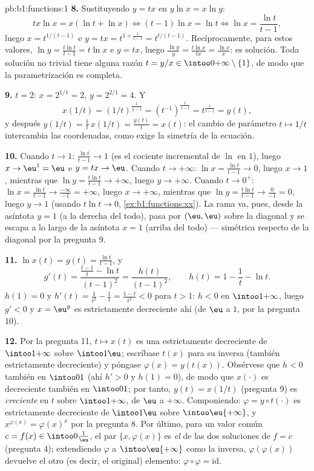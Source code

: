\begin{solution}{pb:b1:functions:1}
\textbf{8.} Sustituyendo $y = tx$ en $y\ln x = x\ln y$:
\[
tx\ln x = x(\ln t + \ln x)
\iff (t - 1)\ln x = \ln t
\iff \ln x = \frac{\ln t}{t - 1} ,
\]
luego $x = t^{1/(t-1)}$ e $y = tx = t^{1 + \frac1{t-1}} = t^{t/(t-1)}$.
Recíprocamente, para estos valores, $\ln y = \frac{t\ln t}{t-1} =
t\ln x$ e $y = tx$, luego $\frac{\ln y}y = \frac{t\ln x}{tx} =
\frac{\ln x}x$: es solución. Toda solución no trivial tiene alguna
razón $t = y/x \in \intoo0{+\infty} \setminus \{1\}$, de modo que la
parametrización es completa.

\textbf{9.} $t = 2$: $x = 2^{1/1} = 2$, $y = 2^{2/1} = 4$. Y
\[
x(1/t) = (1/t)^{\frac1{\frac1t - 1}}
= (t^{-1})^{\frac{t}{1 - t}}
= t^{\frac{t}{t - 1}} = y(t) ,
\]
y después $y(1/t) = \frac1t\,x(1/t) = \frac{y(t)}t = x(t)$: el cambio
de parámetro $t \mapsto 1/t$ intercambia las coordenadas, como exige la
simetría de la ecuación.

\textbf{10.} Cuando $t \to 1$: $\frac{\ln t}{t-1} \to 1$ (es el
cociente incremental de $\ln$ en $1$), luego $x \to \eu^1 = \eu$ e
$y = tx \to \eu$. Cuando $t \to +\infty$: $\ln x = \frac{\ln t}{t-1}
\to 0$, luego $x \to 1$, mientras que $\ln y = \frac{t\ln t}{t-1} \to
+\infty$, luego $y \to +\infty$. Cuando $t \to 0^+$:
$\ln x = \frac{\ln t}{t-1} \to \frac{-\infty}{-1} = +\infty$, luego
$x \to +\infty$, mientras que $\ln y = \frac{t\ln t}{t-1} \to
\frac{0}{-1} = 0$, luego $y \to 1$ (usando $t\ln t \to 0$,
\cref{ex:b1:functions:xx}). La rama va, pues, desde la asíntota $y = 1$
(a la derecha del todo), pasa por $(\eu, \eu)$ sobre la diagonal y se
escapa a lo largo de la asíntota $x = 1$ (arriba del todo) --- simétrica
respecto de la diagonal por la pregunta 9.

\textbf{11.} $\ln x(t) = g(t) = \frac{\ln t}{t-1}$, y
\[
g'(t) = \frac{\frac{t-1}t - \ln t}{(t-1)^2}
= \frac{h(t)}{(t-1)^2},
\qquad h(t) = 1 - \frac1t - \ln t .
\]
$h(1) = 0$ y $h'(t) = \frac1{t^2} - \frac1t = \frac{1 - t}{t^2} < 0$
para $t > 1$: $h < 0$ en $\intoo1{+\infty}$, luego $g' < 0$ y
$x = \eu^g$ es estrictamente decreciente ahí (de $\eu$ a $1$, por la
pregunta 10).

\textbf{12.} Por la pregunta 11, $t \mapsto x(t)$ es una 
estrictamente decreciente de $\intoo1{+\infty}$ sobre $\intoo1\eu$;
escríbase $t(x)$ para su inversa (también estrictamente decreciente) y
póngase $\varphi(x) = y(t(x))$. Obsérvese que $h < 0$ también en
$\intoo01$ (ahí $h' > 0$ y $h(1) = 0$), de modo que $x(\cdot)$ es
decreciente también en $\intoo01$; por tanto, $y(t) = x(1/t)$
(pregunta 9) es \emph{creciente} en $t$ sobre $\intoo1{+\infty}$, de
$\eu$ a $+\infty$. Componiendo: $\varphi = y \circ t(\cdot)$ es
estrictamente decreciente de $\intoo1\eu$ sobre $\intoo\eu{+\infty}$, y
$x^{\varphi(x)} = \varphi(x)^x$ por la pregunta 8. Por último, para un
valor común $c = f(x) \in \intoo0{\frac1\eu}$, el par
$\{x, \varphi(x)\}$ es \emph{el}  de las dos soluciones de
$f = c$ (pregunta 4); extendiendo $\varphi$ a $\intoo\eu{+\infty}$ como
la  inversa, $\varphi(\varphi(x))$ devuelve el otro (es
decir, el original) elemento: $\varphi \circ \varphi = \mathrm{id}$.


\end{solution}
